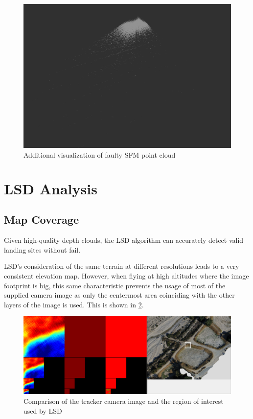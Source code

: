\begin{figure}[h]
    \centering
    \includegraphics[scale=0.15]{images/evaluation/SFM_issues/sfm_pc_fail2.png}
    \caption{Additional visualization of faulty SFM point cloud}
    \label{fig:sfm_pc_fault2}
\end{figure}

\clearpage%

\section{LSD Analysis}\label{sec:eval_LSD}

\subsection{Map Coverage}

Given high-quality depth clouds, the LSD algorithm can accurately detect valid landing sites without fail.

LSD's consideration of the same terrain at different resolutions leads to a very consistent elevation map. However, when flying at high altitudes where the image footprint is big, this same characteristic prevents the usage of most of the supplied camera image as only the centermost area coinciding with the other layers of the image is used. This is shown in \cref{fig:LSD_center_usage}.

\begin{figure}[h]
\centering
\includegraphics[scale=0.14]{images/evaluation/LSD_center_usage.png}
\caption{Comparison of the tracker camera image and the region of interest used by LSD}
\label{fig:LSD_center_usage}
\end{figure}


